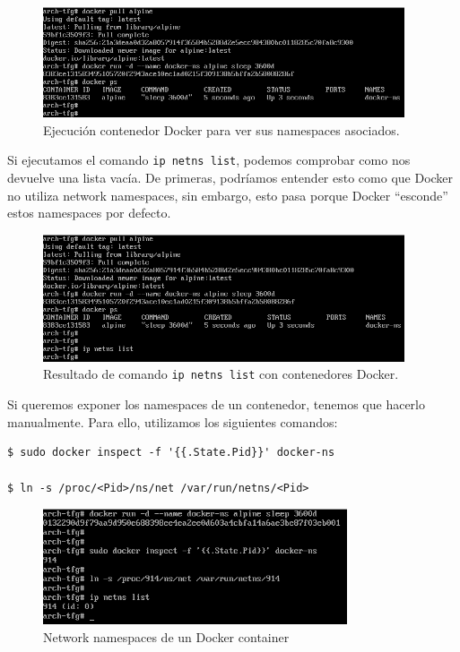 \documentclass[a4paper, oneside, 12pt]{book}
\begin{document}
	\begin{figure}[h!]
		\begin{center}
			\includegraphics[width=0.95\textwidth]{img/docker_ns1.png}
			\caption{Ejecución contenedor Docker para ver sus namespaces asociados.}
		\end{center}
	\end{figure}

	\noindent Si ejecutamos el comando \texttt{ip netns list}, podemos comprobar como nos devuelve una lista vacía. De primeras, podríamos entender esto como que Docker no utiliza network namespaces, sin embargo, esto pasa porque Docker ``esconde'' estos namespaces por defecto.
	
	\begin{figure}[h!]
		\begin{center}
			\includegraphics[width=0.95\textwidth]{img/docker_ns2.png}
			\caption{Resultado de comando \texttt{ip netns list} con contenedores Docker.}
			\end{center}
	\end{figure}

	\pagebreak
	
	\noindent Si queremos exponer los namespaces de un contenedor, tenemos que hacerlo manualmente. Para ello, utilizamos los siguientes comandos:
	
	\begin{verbatim}
$ sudo docker inspect -f '{{.State.Pid}}' docker-ns

$ ln -s /proc/<Pid>/ns/net /var/run/netns/<Pid>
	\end{verbatim}

	\begin{figure}[h!]
		\begin{center}
			\includegraphics[width=0.8\textwidth]{img/docker_ns3.png}
			\caption{Network namespaces de un Docker container}
		\end{center}
	\end{figure}
\end{document}
